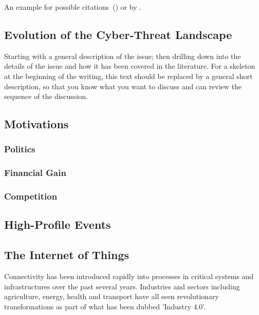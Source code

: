 An example for possible citations~(\cite{Andrew2013empirical}) or by \cite{Asghari2015Economics}.

\subsection{Evolution of the Cyber-Threat Landscape}

Starting with a general description of the issue; then drilling down into the details of the issue and how it has been covered in the literature. For a skeleton at the beginning of the writing, this text should be replaced by a general short description, so that you know what you want to discuss and can review the sequence of the discussion.

\subsection{Motivations}

\subsubsection{Politics}

\subsubsection{Financial Gain}

\subsubsection{Competition}

\subsection{High-Profile Events}

\subsection{The Internet of Things}

Connectivity has been introduced rapidly into processes in critical systems and infrastructures over the past several years. Industries and sectors including agriculture, energy, health and transport have all seen revolutionary transformations as part of what has been dubbed 'Industry 4.0'. 

